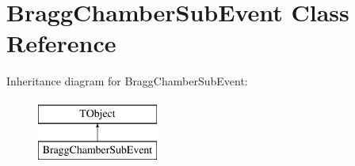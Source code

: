 \hypertarget{class_bragg_chamber_sub_event}{\section{Bragg\-Chamber\-Sub\-Event Class Reference}
\label{class_bragg_chamber_sub_event}
}
Inheritance diagram for Bragg\-Chamber\-Sub\-Event\-:\begin{figure}[H]
\begin{center}
\leavevmode
\includegraphics[height=2.000000cm]{class_bragg_chamber_sub_event}
\end{center}
\end{figure}
